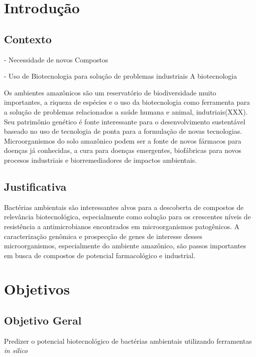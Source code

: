 \setcounter{section}{0}
\section{Introdução}
\label{cap:introducao}

\subsection{Contexto}


- Necessidade de novos Compostos

- Uso de Biotecnologia para solução de problemas industriais
A biotecnologia 

Os ambientes amazônicos são um reservatório de biodiversidade muito importantes,
a riqueza de espécies e o uso da biotecnologia como ferramenta para a solução de problemas relacionados
a saúde humana e animal, indutriais(XXX). Seu patrimônio genético é fonte interessante para o
desenvolvimento sustentável baseado no uso de tecnologia de ponta para a formulação de novas tecnologias.
Microorganismos do solo amazônico podem ser a fonte de novos fármacos para doenças já conhecidas,
a cura para doenças emergentes, biofábricas para novos procesos industriais e biorremediadores
de impactos ambientais.

\subsection{Justificativa}
Bactérias ambientais são interessantes alvos para a descoberta de compostos
de relevância biotecnológica, especialmente como solução para os crescentes níveis
de resistência a antimicrobianos encontrados em microorganismos patogênicos.
A caracterização genômica e prospecção de genes de interesse desses microorganismos,
especialmente do ambiente amazônico, são passos importantes
em busca de compostos de potencial farmacológico e industrial.

\section{Objetivos}

\subsection{Objetivo Geral}

Predizer o potencial biotecnológico de bactérias ambientais utilizando 
ferramentas \textit{in silico} 

